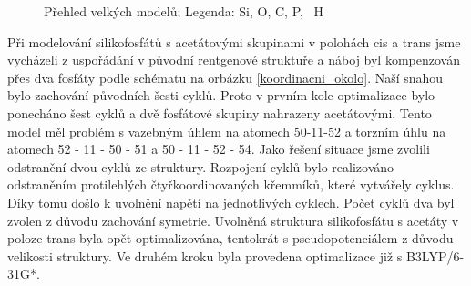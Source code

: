 \documentclass[
digital, %
table,   %
lof,     %
lot,     %
oneside,
]{fithesis3}
\begin{document}
\begin{figure}
\begin{center}
\caption{Přehled velkých modelů;  Legenda:  Si,  O,  C,  P, ~H}
\label{prehled_large}
\end{center}
\end{figure}
Při modelování silikofosfátů s acetátovými skupinami v polohách cis a trans jsme vycházeli z uspořádání v původní rentgenové struktuře a náboj byl kompenzován přes dva fosfáty podle schématu na orbázku \ref{koordinacni_okolo}. Naší snahou bylo zachování původních šesti cyklů. Proto v prvním kole optimalizace bylo ponecháno šest cyklů a dvě fosfátové skupiny nahrazeny acetátovými. Tento model měl problém s vazebným úhlem na atomech 50-11-52 a torzním úhlu na atomech 52 - 11 - 50 - 51 a 50 - 11 - 52 - 54. Jako řešení situace jsme zvolili odstranění dvou cyklů ze struktury. Rozpojení cyklů bylo realizováno odstraněním protilehlých čtyřkoordinovaných křemmíků, které vytvářely cyklus. Díky tomu došlo k uvolnění napětí na jednotlivých cyklech. Počet cyklů dva byl zvolen z důvodu zachování symetrie. Uvolněná struktura silikofosfátu s acetáty v poloze trans byla opět optimalizována, tentokrát s pseudopotenciálem z důvodu velikosti struktury. Ve druhém kroku byla provedena optimalizace již s B3LYP/6-31G*. \\
\end{document}
